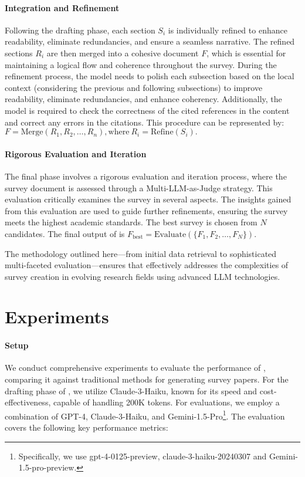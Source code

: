 \paragraph{Integration and Refinement}
Following the drafting phase, each section \(S_i\) is individually refined to enhance readability, eliminate redundancies, and ensure a seamless narrative. The refined sections \(R_i\) are then merged into a cohesive document \(F\), which is essential for maintaining a logical flow and coherence throughout the survey. During the refinement process, the model needs to polish each subsection based on the local context (considering the previous and following subsections) to improve readability, eliminate redundancies, and enhance coherency. Additionally, the model is required to check the correctness of the cited references in the content and correct any errors in the citations. This procedure can be represented by:
$F = \text{Merge}(R_1, R_2, \ldots, R_n), \text{where} \ R_i = \text{Refine}(S_i).$

\paragraph{Rigorous Evaluation and Iteration}
The final phase involves a rigorous evaluation and iteration process, where the survey document is assessed through a Multi-LLM-as-Judge strategy. This evaluation critically examines the survey in several aspects. The insights gained from this evaluation are used to guide further refinements, ensuring the survey meets the highest academic standards. The best survey is chosen from \(N\) candidates. The final output of \ourmethod is $ F_{\text{best}} = \text{Evaluate}(\{F_1, F_2, \ldots, F_N\}).$

The methodology outlined here—from initial data retrieval to sophisticated multi-faceted evaluation—ensures that \ourmethod effectively addresses the complexities of survey creation in evolving research fields using advanced LLM technologies.

\section{Experiments}
\paragraph{Setup}

We conduct comprehensive experiments to evaluate the performance of \ourmethod, comparing it against traditional methods for generating survey papers. For the drafting phase of \ourmethod, we utilize Claude-3-Haiku, known for its speed and cost-effectiveness, capable of handling 200K tokens. For evaluations, we employ a combination of GPT-4, Claude-3-Haiku, and Gemini-1.5-Pro\footnote{Specifically, we use gpt-4-0125-preview, claude-3-haiku-20240307 and Gemini-1.5-pro-preview.}. The evaluation covers the following key performance metrics:

